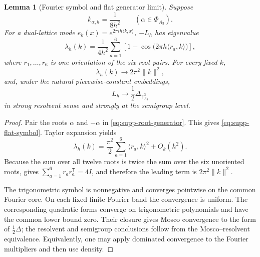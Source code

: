 \documentclass[11pt]{article}
\newtheorem{lemma}[lemma]{Lemma}
\theoremstyle{definition}
\theoremstyle{remark}
\newcommand{\norm}[1]{\lVert#1\rVert}
\begin{document}
\begin{lemma}[Fourier symbol and flat generator limit]
\label{lem:supp-flat-symbol}
Suppose
\begin{equation}
 k_{\alpha,h}=\frac1{8h^2}
 \qquad(\alpha\in\Phi_{A_3}).
 \label{eq:supp-flat-rates}
\end{equation}
For a dual-lattice mode $e_k(x)=e^{2\pi i h\langle k,x\rangle}$,
$-L_h$ has eigenvalue
\begin{equation}
 \lambda_h(k)
 =\frac1{4h^2}\sum_{a=1}^{6}
  \left[1-\cos\bigl(2\pi h\langle r_a,k\rangle\bigr)\right],
 \label{eq:supp-flat-symbol}
\end{equation}
where $r_1,\ldots,r_6$ is one orientation of the six root pairs.  For every
fixed $k$,
\begin{equation}
 \lambda_h(k)\longrightarrow2\pi^2\norm{k}^2,
 \label{eq:supp-flat-symbol-limit}
\end{equation}
and, under the natural piecewise-constant embeddings,
\begin{equation}
 L_h\longrightarrow\frac12\Delta_{\mathbb T^3_{A_3}}
 \label{eq:supp-flat-generator-limit}
\end{equation}
in strong resolvent sense and strongly at the semigroup level.
\end{lemma}

\begin{proof}
Pair the roots $\alpha$ and $-\alpha$ in
\eqref{eq:supp-root-generator}.  This gives
\eqref{eq:supp-flat-symbol}.  Taylor expansion yields
\[
 \lambda_h(k)
 =\frac{\pi^2}{2}\sum_{a=1}^6\langle r_a,k\rangle^2+O_k(h^2).
\]
Because the sum over all twelve roots is twice the sum over the six unoriented
roots,  gives
$\sum_{a=1}^6r_ar_a^{\mathsf T}=4I$, and therefore the leading term is
$2\pi^2\norm{k}^2$.

The trigonometric symbol is nonnegative and converges pointwise on the common
Fourier core.  On each fixed finite Fourier band the convergence is uniform.
The corresponding quadratic forms converge on trigonometric polynomials and
have the common lower bound zero.  Their closure gives Mosco convergence to
the form of $\tfrac12\Delta$; the resolvent and semigroup conclusions follow
from the Mosco--resolvent equivalence.  Equivalently, one may apply dominated
convergence to the Fourier multipliers and then use density.
\end{proof}
\end{document}
